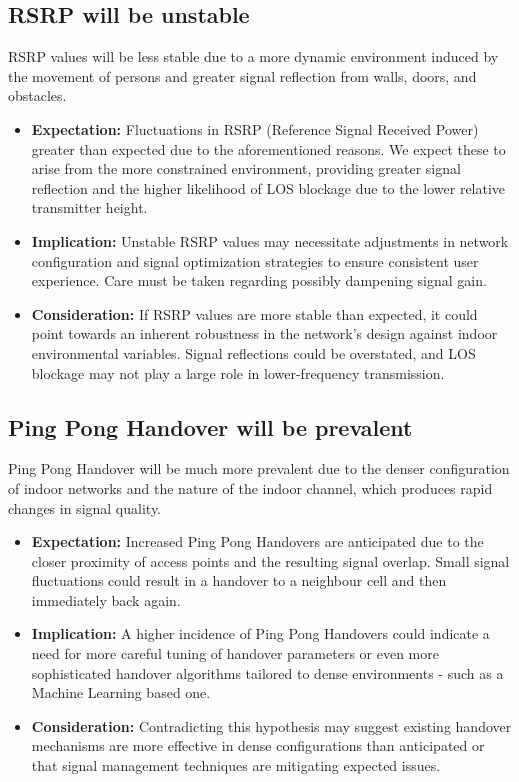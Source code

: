 \subsection{RSRP will be unstable}
RSRP values will be less stable due to a more dynamic environment induced by the movement of persons and greater signal reflection from walls, doors, and obstacles.
\begin{itemize}
    \item \textbf{Expectation:} Fluctuations in RSRP (Reference Signal Received Power) greater than expected due to the aforementioned reasons. We expect these to arise from the more constrained environment, providing greater signal reflection and the higher likelihood of LOS blockage due to the lower relative transmitter height.
    \item \textbf{Implication:} Unstable RSRP values may necessitate adjustments in network configuration and signal optimization strategies to ensure consistent user experience. Care must be taken regarding possibly dampening signal gain.
    \item \textbf{Consideration:} If RSRP values are more stable than expected, it could point towards an inherent robustness in the network's design against indoor environmental variables. Signal reflections could be overstated, and LOS blockage may not play a large role in lower-frequency transmission.
\end{itemize}

\subsection{Ping Pong Handover will be prevalent}
Ping Pong Handover will be much more prevalent due to the denser configuration of indoor networks and the nature of the indoor channel, which produces rapid changes in signal quality.
\begin{itemize}
    \item \textbf{Expectation:} Increased Ping Pong Handovers are anticipated due to the closer proximity of access points and the resulting signal overlap. Small signal fluctuations could result in a handover to a neighbour cell and then immediately back again.
    \item \textbf{Implication:} A higher incidence of Ping Pong Handovers could indicate a need for more careful tuning of handover parameters or even more sophisticated handover algorithms tailored to dense environments - such as a Machine Learning based one.
    \item \textbf{Consideration:} Contradicting this hypothesis may suggest existing handover mechanisms are more effective in dense configurations than anticipated or that signal management techniques are mitigating expected issues.
\end{itemize}



